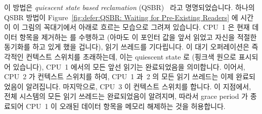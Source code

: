 이 방법은 \emph{quiescent state based reclamation}
(QSBR)~\cite{ThomasEHart2006a} 라고 명명되었습니다.
하나의 QSBR 방법이
Figure~\ref{fig:defer:QSBR: Waiting for Pre-Existing Readers}
에 시간이 이 그림의 꼭대기에서 아래로 흐르는 모습으로 그려져 있습니다.
CPU~1 은 현재 데이터 항목을 제거하는  를 수행하고 (아마도 이
포인터 값을 앞서 읽었고 자신을 적절한 동기화를 하고 있게 했을 겁니다), 읽기
쓰레드를 기다립니다.
이 대기 오퍼레이션은 즉각적인 컨텍스트 스위치를 초래하는데, 이는 quiescent
state 로 (핑크색 원으로 표시되어 있습니다), CPU~1 에서의 모든 앞선 읽기는
완료되었음을 의미합니다.
이어서, CPU~2 가 컨텍스트 스위치를 하여, CPU~1 과~2 의 모든 읽기 쓰레드는 이제
완료되었음이 알려집니다.
마지막으로, CPU~3 이 컨텍스트 스위치를 합니다.
이 지점에서, 전체 시스템의 모든 읽기 쓰레드는 완료되었음이 알려지며, 따라서
grace period 가 종료되어 CPU~1 이 오래된 데이터 항목을 메모리 해제하는 것을
허용합니다.

